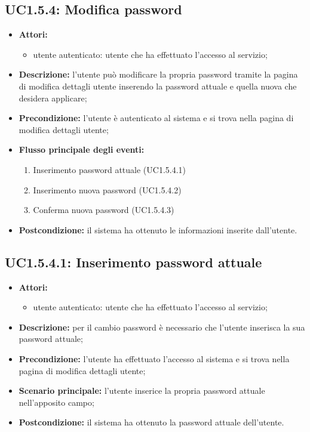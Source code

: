 \subsection{UC1.5.4: Modifica password}
\begin{itemize}
	\item \textbf{Attori:}
	\begin{itemize}
		\item utente autenticato: utente che ha effettuato l'accesso al servizio;
	\end{itemize}
	\item \textbf{Descrizione:} l'utente può modificare la propria password tramite la pagina di modifica dettagli utente inserendo la password attuale e quella nuova che desidera applicare;
	\item \textbf{Precondizione:} l'utente è autenticato al sistema e si trova nella pagina di modifica dettagli utente;
	\item \textbf{Flusso principale degli eventi:}
	\begin{enumerate}
		\item Inserimento password attuale (UC1.5.4.1)
		\item Inserimento nuova password (UC1.5.4.2)
		\item Conferma nuova password (UC1.5.4.3)
	\end{enumerate}
	\item \textbf{Postcondizione:} il sistema ha ottenuto le informazioni inserite dall'utente.
\end{itemize}

\subsection{UC1.5.4.1: Inserimento password attuale}
\begin{itemize}
	\item \textbf{Attori:}
	\begin{itemize}
		\item utente autenticato: utente che ha effettuato l'accesso al servizio;
	\end{itemize}
	\item \textbf{Descrizione:} per il cambio password è necessario che l'utente inserisca la sua password attuale;
	\item \textbf{Precondizione:} l'utente ha effettuato l'accesso al sistema e si trova nella pagina di modifica dettagli utente;
	\item \textbf{Scenario principale:} l'utente inserice la propria password attuale nell'apposito campo;
	\item \textbf{Postcondizione:} il sistema ha ottenuto la password attuale dell'utente.
\end{itemize}

